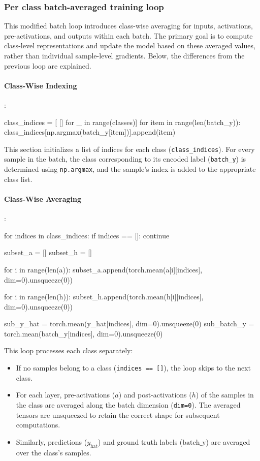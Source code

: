 \documentclass[english]{article}
\begin{document}
\subsubsection{Per class batch-averaged training loop}


This modified batch loop introduces class-wise averaging for inputs, activations, pre-activations, and outputs within each batch. The primary goal is to compute class-level representations and update the model based on these averaged values, rather than individual sample-level gradients. Below, the differences from the previous loop are explained.

\paragraph{Class-Wise Indexing}:
\begin{python}
class_indices = [ [] for _ in range(classes)]
for item in range(len(batch_y)):
    class_indices[np.argmax(batch_y[item])].append(item)
\end{python}
This section initializes a list of indices for each class (\texttt{class\_indices}). For every sample in the batch, the class corresponding to its encoded label (\texttt{batch\_y}) is determined using \texttt{np.argmax}, and the sample's index is added to the appropriate class list. 

\paragraph{Class-Wise Averaging}:
\begin{python}
for indices in class_indices:
    if indices == []:
        continue

    subset_a = []
    subset_h = []

    for i in range(len(a)):
        subset_a.append(torch.mean(a[i][indices], dim=0).unsqueeze(0))

    for i in range(len(h)):
        subset_h.append(torch.mean(h[i][indices], dim=0).unsqueeze(0))

    sub_y_hat = torch.mean(y_hat[indices], dim=0).unsqueeze(0)
    sub_batch_y = torch.mean(batch_y[indices], dim=0).unsqueeze(0)
\end{python}
This loop processes each class separately:
\begin{itemize}
    \item If no samples belong to a class (\texttt{indices == []}), the loop skips to the next class.
    \item For each layer, pre-activations (\(a\)) and post-activations (\(h\)) of the samples in the class are averaged along the batch dimension (\texttt{dim=0}). The averaged tensors are unsqueezed to retain the correct shape for subsequent computations.
    \item Similarly, predictions (\(y_{\text{hat}}\)) and ground truth labels (\(\text{batch\_y}\)) are averaged over the class's samples.
\end{itemize}
\end{document}
